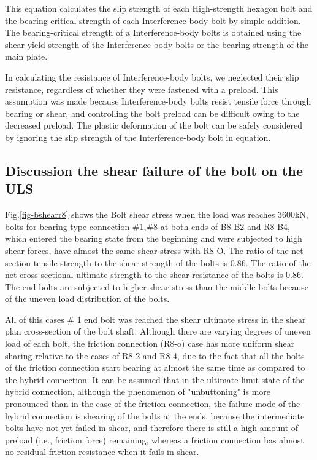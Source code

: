 This equation calculates the slip strength of each High-strength hexagon bolt and the bearing-critical strength of each Interference-body bolt by simple addition. The bearing-critical strength of a Interference-body bolts is obtained using the shear yield strength of the Interference-body bolts or the bearing strength of the main plate.

In calculating the resistance of Interference-body bolts, we neglected their slip resistance, regardless of whether they were fastened with a preload. This assumption was made because Interference-body bolts resist tensile force through bearing or shear, and controlling the bolt preload can be difficult owing to the decreased preload. The plastic deformation of the bolt can be safely considered by ignoring the slip strength of the Interference-body bolt in equation.


\subsection{Discussion the shear failure of the bolt on the ULS}

Fig.\ref{fig-bshearr8} shows the Bolt shear stress when the load was reaches 3600kN, bolts for bearing type connection \#1,\#8 at both ends of B8-B2 and R8-B4, which entered the bearing state from the beginning and were subjected to high shear forces, have almost the same shear stress with R8-O. The ratio of the net section tensile strength to the shear strength of the bolts is 0.86. The ratio of the net cross-sectional ultimate strength to the shear resistance of the bolts is 0.86. The end bolts are subjected to higher shear stress than the middle bolts because of the uneven load distribution of the bolts. 

All of this cases \# 1 end bolt was reached the shear ultimate stress in the shear plan cross-section of the bolt shaft.
Although there are varying degrees of uneven load of each bolt, the friction connection (R8-o) case has more uniform shear sharing relative to the cases of R8-2 and R8-4, due to the fact that all the bolts of the friction connection start bearing at almost the same time as compared to the hybrid connection. It can be assumed that in the ultimate limit state of the hybrid connection, although the phenomenon of "unbuttoning" is more pronounced than in the case of the friction connection, the failure mode of the hybrid connection is shearing of the bolts at the ends, because the intermediate bolts have not yet failed in shear, and therefore there is still a high amount of preload (i.e., friction force) remaining, whereas a friction connection has almost no residual friction resistance when it fails in shear.

